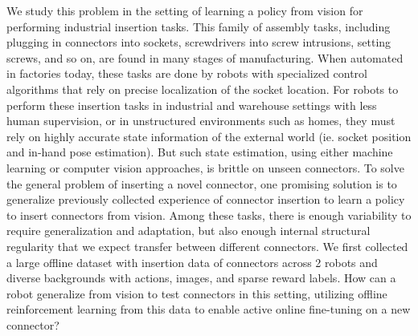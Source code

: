 We study this problem in the setting of learning a policy from vision for performing industrial insertion tasks.
This family of assembly tasks, including plugging in connectors into sockets, screwdrivers into screw intrusions, setting screws, and so on, are found in many stages of manufacturing.
When automated in factories today, these tasks are done by robots with specialized control algorithms that rely on precise localization of the socket location.
For robots to perform these insertion tasks in industrial and warehouse settings with less human supervision, or in unstructured environments such as homes, they must rely on highly accurate state information of the external world (ie. socket position and in-hand pose estimation).
But such state estimation, using either machine learning or computer vision approaches, is brittle on unseen connectors.
To solve the general problem of inserting a novel connector, one promising solution is to generalize previously collected experience of connector insertion to learn a policy to insert connectors from vision.
Among these tasks, there is enough variability to require generalization and adaptation, but also enough internal structural regularity that we expect transfer between different connectors.
We first collected a large offline dataset with insertion data of \numconnectors{} connectors across 2 robots and diverse backgrounds with actions, images, and sparse reward labels.
How can a robot generalize from vision to test connectors in this setting, utilizing offline reinforcement learning from this data to enable active online fine-tuning on a new connector?

